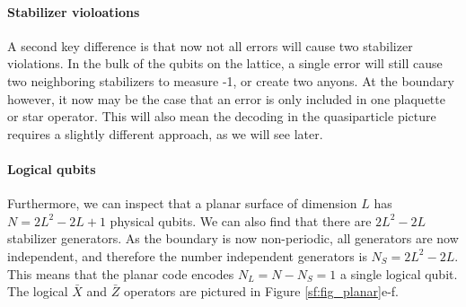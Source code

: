 \paragraph{Stabilizer violoations}
A second key difference is that now not all errors will cause two stabilizer violations. In the bulk of the qubits on the lattice, a single error will still cause two neighboring stabilizers to measure -1, or create two anyons. At the boundary however, it now may be the case that an error is only included in one plaquette or star operator. This will also mean the decoding in the quasiparticle picture requires a slightly different approach, as we will see later.

\paragraph{Logical qubits}
Furthermore, we can inspect that a planar surface of dimension $L$ has $N = 2L^2-2L+1$ physical qubits. We can also find that there are $2L^2-2L$ stabilizer generators. As the boundary is now non-periodic, all generators are now independent, and therefore the number independent generators is $N_S = 2L^2-2L$. This means that the planar code encodes $N_L = N-N_S = 1$ a single logical qubit. The logical $\bar{X}$ and $\bar{Z}$ operators are pictured in Figure \ref{sf:fig_planar}e-f. 

\def\QS{15}
\def\s{1.5}

